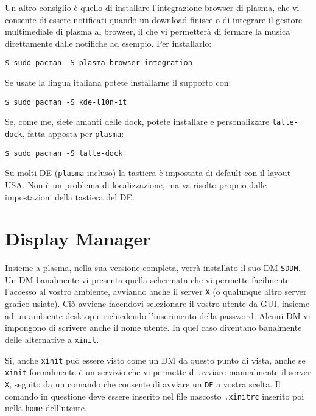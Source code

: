 \documentclass[twoside,italian]{book}
\newcommand{\code}[1]{\texttt{#1}}
\begin{document}
    Un altro consiglio è quello di installare l'integrazione browser di plasma, che vi consente di essere notificati quando un download finisce o di integrare il gestore multimediale di plasma al browser, il che vi permetterà di fermare la musica direttamente dalle notifiche ad esempio. Per installarlo:
    \begin{lstlisting}
$ sudo pacman -S plasma-browser-integration
    \end{lstlisting}
    
    Se usate la lingua italiana potete installarne il supporto con:
    \begin{lstlisting}
$ sudo pacman -S kde-l10n-it
    \end{lstlisting}
    
    Se, come me, siete amanti delle dock, potete installare e personalizzare \code{latte-dock}, fatta apposta per \code{plasma}:
    \begin{lstlisting}
$ sudo pacman -S latte-dock
    \end{lstlisting}
    
    \begin{tcolorbox}[floatplacement=b,width=\textwidth,title={NOTA BENE:}, colback={lightgray},colbacktitle=gray,coltitle=white,colupper=black]
        Su molti \ac{DE} (\code{plasma} incluso) la tastiera è impostata di default con il layout USA. Non è un problema di localizzazione, ma va risolto proprio dalle impostazioni della tastiera del \ac{DE}.
    \end{tcolorbox}
        
\section{Display Manager}
    Insieme a plasma, nella sua versione completa, verrà installato il suo \ac{DM} \code{SDDM}. Un \ac{DM} banalmente vi presenta quella schermata che vi permette facilmente l'accesso al vostro ambiente, avviando anche il server \code{X} (o qualunque altro server grafico usiate). Ciò avviene facendovi selezionare il vostro utente da \ac{GUI}, insieme ad un ambiente desktop e richiedendo l'inserimento della password. Alcuni \ac{DM} vi impongono di scrivere anche il nome utente. In quel caso diventano banalmente delle alternative a \code{xinit}.
    
    Si, anche \code{xinit} può essere visto come un \ac{DM} da questo punto di vista, anche se \code{xinit} formalmente è un servizio che vi permette di avviare manualmente il server \code{X}, seguito da un comando che consente di avviare un \code{DE} a vostra scelta. Il comando in questione deve essere inserito nel file nascosto \code{.xinitrc} inserito poi nella \code{home} dell'utente.
    
\end{document}

